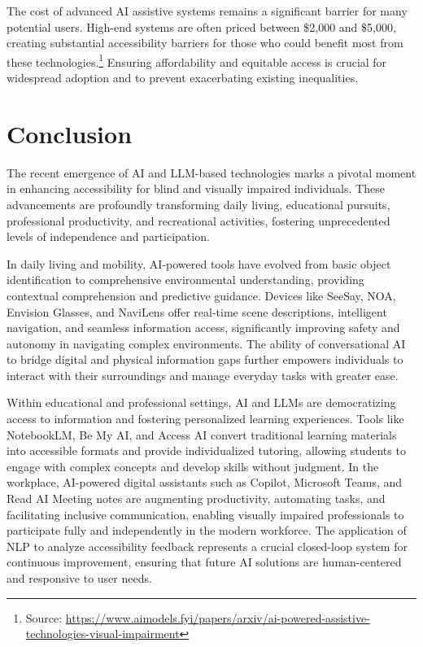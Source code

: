 The cost of advanced AI assistive systems remains a significant barrier for many potential users. High-end systems are often priced between \$2,000 and \$5,000, creating substantial accessibility barriers for those who could benefit most from these technologies.\footnote{Source: \url{https://www.aimodels.fyi/papers/arxiv/ai-powered-assistive-technologies-visual-impairment}} Ensuring affordability and equitable access is crucial for widespread adoption and to prevent exacerbating existing inequalities.

\section{Conclusion}



The recent emergence of AI and LLM-based technologies marks a pivotal moment in enhancing accessibility for blind and visually impaired individuals. These advancements are profoundly transforming daily living, educational pursuits, professional productivity, and recreational activities, fostering unprecedented levels of independence and participation.

In daily living and mobility, AI-powered tools have evolved from basic object identification to comprehensive environmental understanding, providing contextual comprehension and predictive guidance. Devices like SeeSay, NOA, Envision Glasses, and NaviLens offer real-time scene descriptions, intelligent navigation, and seamless information access, significantly improving safety and autonomy in navigating complex environments. The ability of conversational AI to bridge digital and physical information gaps further empowers individuals to interact with their surroundings and manage everyday tasks with greater ease.

Within educational and professional settings, AI and LLMs are democratizing access to information and fostering personalized learning experiences. Tools like NotebookLM, Be My AI, and Access AI convert traditional learning materials into accessible formats and provide individualized tutoring, allowing students to engage with complex concepts and develop skills without judgment. In the workplace, AI-powered digital assistants such as Copilot, Microsoft Teams, and Read AI Meeting notes are augmenting productivity, automating tasks, and facilitating inclusive communication, enabling visually impaired professionals to participate fully and independently in the modern workforce. The application of NLP to analyze accessibility feedback represents a crucial closed-loop system for continuous improvement, ensuring that future AI solutions are human-centered and responsive to user needs.


